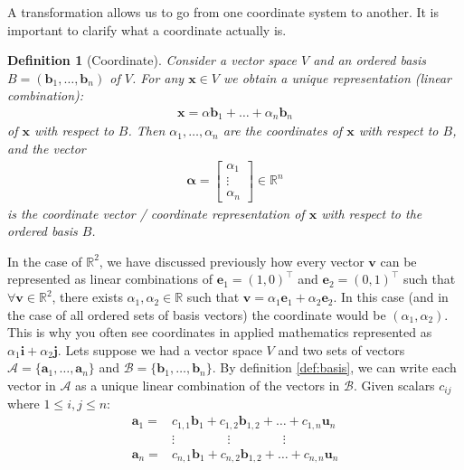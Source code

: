 \documentclass[a4paper,12pt]{article}
\newcommand{\set}[1]{\mathcal{#1}}
\newcommand{\vectr}[1]{\textbf{#1}}
\newcommand{\real}{\mathbb{R}}
\newtheorem{definition}{Definition}[section]
\begin{document}
	A transformation allows us to go from one coordinate system to another. It is important to clarify what a coordinate actually is. 
	\begin{definition}[Coordinate] \cite[page 50]{mml_book}
		\normalfont Consider a vector space $ V $ and an ordered basis $ B = (\vectr{b}_1, \ldots, \vectr{b}_n) $ of $ V $. For any $ \vectr{x} \in V $ we obtain a unique representation (linear combination):
		\begin{align}
			\vectr{x} = \alpha \vectr{b}_1 + \ldots + \alpha_n \vectr{b}_n 
		\end{align}
		of $ \vectr{x} $ with respect to $ B $. Then $ \alpha_1, \ldots, \alpha_n $ are the coordinates of $ \vectr{x} $ with respect to $ B $, and the vector
		\begin{align}
			\boldsymbol{\alpha} = \begin{bmatrix}
				\alpha_1 \\
				\vdots \\
				\alpha_n
			\end{bmatrix} \in \real^{n} 
		\end{align}
		is the coordinate vector / coordinate representation of $ \vectr{x} $ with respect to the ordered basis $ B $.
		\label{def:coordinate}
	\end{definition}
	In the case of $ \real^{2} $, we have discussed previously how every vector $ \vectr{v} $ can be represented as linear combinations of $ \vectr{e}_1 = (1, 0)^{\top} $ and $ \vectr{e}_2 = (0, 1)^{\top} $ such that $ \forall \vectr{v} \in \real^{2} $, there exists $ \alpha_1, \alpha_2 \in \real $ such that $ \vectr{v} = \alpha_1 \vectr{e}_1 + \alpha_2 \vectr{e}_2 $. In this case (and in the case of all ordered sets of basis vectors) the coordinate would be $ (\alpha_1, \alpha_2) $. This is why you often see coordinates in applied mathematics represented as $ \alpha_1 \vectr{i} + \alpha_2 \vectr{j} $. Lets suppose we had a vector space $ V $ and two sets of vectors $ \set{A} = \{\vectr{a}_1,\ldots,\vectr{a}_n\} $ and $ \set{B} = \{\vectr{b}_1,\ldots,\vectr{b}_n\} $.  By definition \ref{def:basis}, we can write each vector in $ \set{A} $ as a unique linear combination of the vectors in $ \set{B} $. Given scalars $ c_{ij} $ where $ 1 \leq i,j \leq n $:
	\begin{align*}
		\vectr{a}_1 =& c_{1,1}\vectr{b}_1 + c_{1,2}\vectr{b}_{1,2} + \ldots + c_{1,n}\vectr{u}_n \\
		&\vdots \hspace{50pt} \vdots \hspace{50pt} \vdots \\ 
		\vectr{a}_n =& c_{n,1}\vectr{b}_1 + c_{n,2}\vectr{b}_{1,2} + \ldots + c_{n,n}\vectr{u}_n 
	\end{align*}
\end{document}
